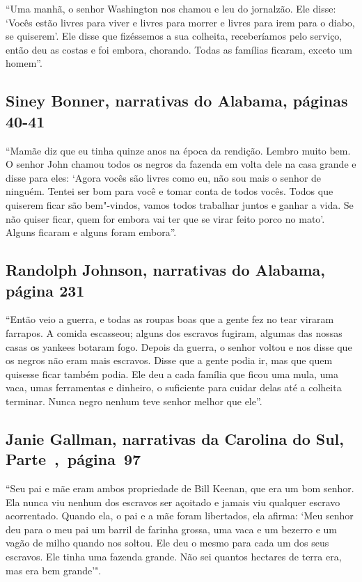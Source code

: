 ``Uma manhã, o senhor Washington nos chamou e leu do jornalzão. Ele
disse: `Vocês estão livres para viver e livres para morrer e livres para
irem para o diabo, se quiserem'. Ele disse que fizéssemos a sua
colheita, receberíamos pelo serviço, então deu as costas e foi embora,
chorando. Todas as famílias ficaram, exceto um homem''.

\subsection{Siney Bonner, narrativas do Alabama, páginas 40-41} \label{ref29}

``Mamãe diz que eu tinha quinze anos na época da rendição. Lembro muito
bem. O senhor John chamou todos os negros da fazenda em volta dele na
casa grande e disse para eles: `Agora vocês são livres como eu, não sou
mais o senhor de ninguém. Tentei ser bom para você e tomar conta de
todos vocês. Todos que quiserem ficar são bem"-vindos, vamos todos
trabalhar juntos e ganhar a vida. Se não quiser ficar, quem for embora
vai ter que se virar feito porco no mato'. Alguns ficaram e alguns foram
embora''.

\subsection{Randolph Johnson, narrativas do Alabama, página 231}
\label{ref164}

``Então veio a guerra, e todas as roupas boas que a gente fez no tear
viraram farrapos. A comida escasseou; alguns dos escravos fugiram,
algumas das nossas casas os yankees botaram fogo. Depois da guerra, o
senhor voltou e nos disse que os negros não eram mais escravos. Disse
que a gente podia ir, mas que quem quisesse ficar também podia. Ele deu
a cada família que ficou uma mula, uma vaca, umas ferramentas e
dinheiro, o suficiente para cuidar delas até a colheita terminar. Nunca
negro nenhum teve senhor melhor que ele''.

\subsection{Janie Gallman, narrativas da Carolina do Sul, Parte~,~página~97}
\label{ref97} 

``Seu pai e mãe eram ambos propriedade de Bill Keenan, que era um bom
senhor. Ela nunca viu nenhum dos escravos ser açoitado e jamais viu
qualquer escravo acorrentado. Quando ela, o pai e a mãe foram
libertados, ela afirma: `Meu senhor deu para o meu pai um barril de
farinha grossa, uma vaca e um bezerro e um vagão de milho quando nos
soltou. Ele deu o mesmo para cada um dos seus escravos. Ele tinha uma
fazenda grande. Não sei quantos hectares de terra era, mas era bem
grande'".

